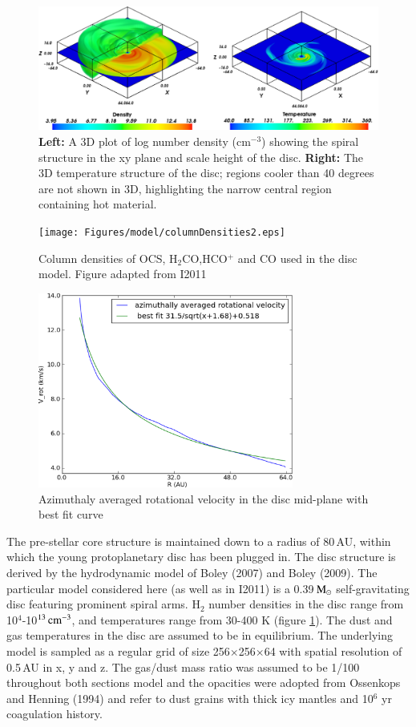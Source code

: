 \documentclass[useAMS,usenatbib]{mn2e}
\begin{document}
\begin{figure}
 \includegraphics[width=168mm]{Figures/model/rhoT6.eps}
 \caption{{\bf Left:} A 3D plot of log number density (cm$^{-3}$) showing the spiral structure in the xy plane and scale height of the disc. {\bf Right:} The 3D temperature structure of the disc; regions cooler than 40 degrees are not shown in 3D, highlighting the narrow central region containing hot material.}
 \label{rhoT} 
\end{figure}

\begin{figure}
 \texttt{[image: Figures/model/columnDensities2.eps]}
 \caption{Column densities of OCS, H$_2$CO,HCO$^+$ and CO used in the disc model. Figure adapted from I2011}
 \label{Chemistry} 
\end{figure}

\begin{figure}
 \includegraphics[width=84mm]{Figures/model/rotational_velocities.eps}
 \caption{Azimuthaly averaged rotational velocity in the disc mid-plane with best fit curve}
 \label{velocity}
\end{figure}


The pre-stellar core structure is maintained down to a radius of 80\,AU, within which the young protoplanetary disc has been plugged in. The disc structure is derived by the hydrodynamic model of Boley (2007) and Boley (2009). The particular model considered here (as well as in I2011) is a 0.39$\,\rm{M}_\odot$ self-gravitating disc featuring prominent spiral arms. H$_2$ number densities in the disc range from 10$^{4}$-10$^{13}\,\rm{cm}^{-3}$, and temperatures range from 30-400 K (figure \ref{rhoT}). The dust and gas temperatures in the disc are assumed to be in equilibrium. The underlying model is sampled as a regular grid of size 256$\times$256$\times$64 with spatial resolution of 0.5$\,$AU in x, y and z. The gas/dust mass ratio was assumed to be 1/100 throughout both sections model and the opacities were adopted from Ossenkops and Henning (1994) and refer to dust grains with thick icy mantles and 10$^6$ yr coagulation history.\newline
\end{document}

